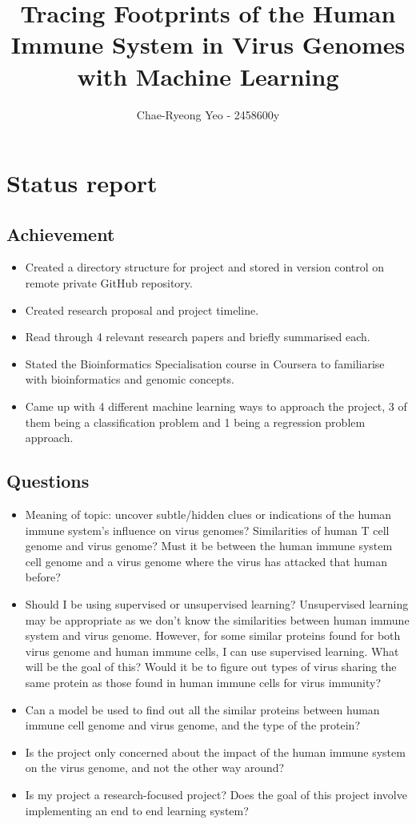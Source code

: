 \documentclass[11pt]{article}
\title{ {{Tracing Footprints of the Human Immune System in Virus Genomes with Machine Learning}} }
\author{ {{Chae-Ryeong Yeo}} - {{2458600y}} }
\begin{document}
    \maketitle
    
    
     

\section{Status report}

\subsection{Achievement}\label{proposal}

\begin{itemize}
\item Created a directory structure for project and stored in version control on remote private GitHub repository.
\item Created research proposal and project timeline.
\item Read through 4 relevant research papers and briefly summarised each.
\item Stated the Bioinformatics Specialisation course in Coursera to familiarise with bioinformatics and genomic concepts.
\item Came up with 4 different machine learning ways to approach the project, 3 of them being a classification problem and 1 being a regression problem approach.
\end{itemize}

\subsection{Questions}\label{progress}

\begin{itemize}
\item Meaning of topic: uncover subtle/hidden clues or indications of the human immune system's influence on virus genomes? Similarities of human T cell genome and virus genome? Must it be between the human immune system cell genome and a virus genome where the virus has attacked that human before?
\item Should I be using supervised or unsupervised learning? Unsupervised learning may be appropriate as we don’t know the similarities between human immune system and virus genome. However, for some similar proteins found for both virus genome and human immune cells, I can use supervised learning. What will be the goal of this? Would it be to figure out types of virus sharing the same protein as those found in human immune cells for virus immunity?
\item Can a model be used to find out all the similar proteins between human immune cell genome and virus genome, and the type of the protein?
\item Is the project only concerned about the impact of the human immune system on the virus genome, and not the other way around?
\item Is my project a research-focused project? Does the goal of this project involve implementing an end to end learning system?
\end{itemize}
\end{document}
